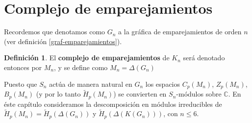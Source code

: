 \documentclass[12pt]{book}
\theoremstyle{definition}
\newtheorem{definition}[theorem]{Definición}
\newcounter{in}
\newcounter{ini}
\begin{document}
\section{Complejo de emparejamientos}
\label{complejo-emparejamientos}

Recordemos que denotamos como $G_{n}$ a la gráfica de
emparejamientos de orden $n$ (ver definición \ref{graf-emparejamientos}).

\begin{definition}
El \textbf{complejo de emparejamientos} de $K_{n}$ será denotado
entonces por $M_{n}$, y se define como $M_{n}=\Delta(G_{n})$
\end{definition}

Puesto que $S_{n}$ actúa de manera
natural en $G_{n}$ los espacios $C_{p}(M_{n})$, $Z_{p}(M_{n})$,
$B_{p}(M_{n})$ (y por lo tanto $\widetilde H_{p}(M_{n})$) se convierten en
$S_{n}$-módulos sobre $\mathbb{C}$. En éste capítulo consideramos
la descomposición en módulos irreducibles de
$\widetilde H_{p}(M_{n})=\widetilde H_{p}(\Delta(G_{n}))$ y
$\widetilde H_{p}(\Delta(K(G_{n})))$, con $n\leq 6$.
\end{document}
